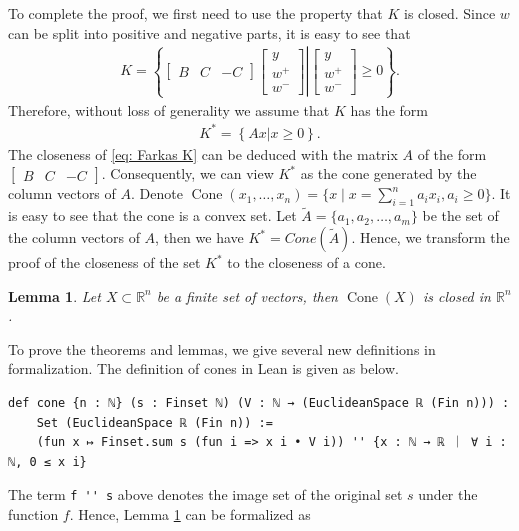 \documentclass[sn-mathphys]{JORSC-jnl}%
\theoremstyle{thmstyleone}%
\newtheorem{lemma}[theorem]{Lemma}%
\theoremstyle{thmstylethree}%
\newcommand{\lean}[1]{\lstinline[language=lean, mathescape=true]{#1}}
\begin{document}
To complete the proof, we first need to use the property that $K$ is closed. Since $w$ can be split into positive and negative parts, it is easy to see that
\begin{align*}
    K = \left\{
    \left.\begin{bmatrix}
        B & C & -C
    \end{bmatrix}
    \begin{bmatrix}
        y\\w^+\\w^-
    \end{bmatrix}\right\lvert
    \begin{bmatrix}
        y\\w^+\\w^-
    \end{bmatrix} \geqslant 0
    \right\}.
\end{align*}
Therefore, without loss of generality we assume that $K$ has the form
\begin{align*}
    K^\ast = \left\{Ax\left\lvert\right.x\geqslant 0 \right\}.
\end{align*}
The closeness of \eqref{eq: Farkas K} can be deduced with the matrix $A$ of the form $\begin{bmatrix}
        B & C & -C
\end{bmatrix}$.
Consequently, we can view $K^\ast$ as the cone generated by the column vectors of $A$. Denote $\operatorname{Cone}({x_1,\dots,x_n}) = \{x \mid x = \sum_{i=1}^n a_i x_i, a_i \geq 0\}$. It is easy to see that the cone is a convex set. Let $\widetilde{A} = \{a_1, a_2, \dots, a_m\}$ be the set of the column vectors of $A$, then we have $K^\ast = Cone(\widetilde{A})$. Hence, we transform the proof of the closeness of the set $K^\ast$ to the closeness of a cone.
\begin{lemma}\label{lemma: closed}
    Let $X \subset \mathbb{R}^n$ be a finite set of vectors, then $\operatorname{Cone}(X)$ is closed in $\mathbb{R}^n$.
\end{lemma}
To prove the theorems and lemmas, we give several new definitions in formalization. The definition of cones in Lean is given as below.
\begin{lstlisting}
def cone {n : ℕ} (s : Finset ℕ) (V : ℕ → (EuclideanSpace ℝ (Fin n))) :
    Set (EuclideanSpace ℝ (Fin n)) := 
    (fun x ↦ Finset.sum s (fun i => x i • V i)) '' {x : ℕ → ℝ ｜ ∀ i : ℕ, 0 ≤ x i}
\end{lstlisting}
The term \lean{f '' s} above denotes the image set of the original set $s$ under the function $f$. Hence,  Lemma \ref{lemma: closed} can be formalized as
\end{document}
